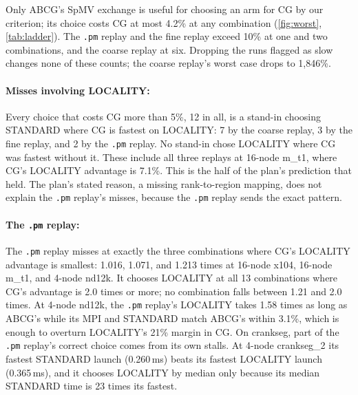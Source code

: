 \documentclass[11pt]{article}
\newcommand{\pmrep}{\texttt{.pm} replay}
\begin{document}
Only ABCG's SpMV exchange is useful for choosing an arm for CG by our criterion; its
choice costs CG at most 4.2\% at any combination (\cref{fig:worst}, \cref{tab:ladder}).
The \pmrep{} and the fine replay exceed 10\% at one and two combinations, and the coarse
replay at six. Dropping the runs flagged as slow changes none of these counts; the
coarse replay's worst case drops to 1,846\%.

\paragraph{Misses involving LOCALITY:} Every choice that costs CG more than 5\%, 12 in
all, is a stand-in choosing STANDARD where CG is fastest on LOCALITY: 7 by the coarse
replay, 3 by the fine replay, and 2 by the \pmrep. No stand-in chose LOCALITY where CG
was fastest without it. These include all three replays at 16-node m\_t1, where CG's
LOCALITY advantage is 7.1\%. This is the half of the plan's prediction that held. The
plan's stated reason, a missing rank-to-region mapping, does not explain the
\pmrep's misses, because the \pmrep{} sends the exact pattern.

\paragraph{The \pmrep:} The \pmrep{} misses at exactly the three combinations where
CG's LOCALITY advantage is smallest: 1.016, 1.071, and 1.213 times at 16-node x104,
16-node m\_t1, and 4-node nd12k. It chooses LOCALITY at all 13 combinations where CG's
advantage is 2.0 times or more; no combination falls between 1.21 and 2.0 times. At
4-node nd12k, the \pmrep's LOCALITY takes 1.58 times as long as ABCG's while its MPI and
STANDARD match ABCG's within 3.1\%, which is enough to overturn LOCALITY's 21\% margin in
CG. On crankseg, part of the \pmrep's correct choice comes from its own stalls. At
4-node crankseg\_2 its fastest STANDARD launch (0.260\,ms) beats its fastest LOCALITY
launch (0.365\,ms), and it chooses LOCALITY by median only because its median STANDARD
time is 23 times its fastest.
\end{document}
